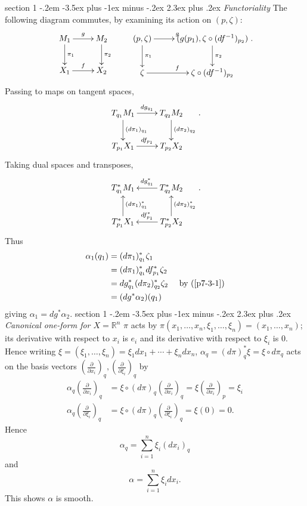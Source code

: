 \documentclass[12pt]{article}
\makeatletter
\theoremstyle{norm}
\newcommand{\R}[0]{\mathbb{R}}
\newcommand{\al}[0]{\alpha}
\newcommand{\pa}[1]{\left( {#1} \right)}
\newcommand{\pd}[2]{\frac{\partial #1}{\partial #2}}
\newenvironment{problem}{\@startsection
       {section}
       {1}
       {-.2em}
       {-3.5ex plus -1ex minus -.2ex}
       {2.3ex plus .2ex}
       {\pagebreak[3]%
       \large\bf\noindent{Problem }
       }
       }
       {%
       }
\makeatother
\begin{document}
\begin{problem}{\it Functoriality}
The following diagram commutes, by examining its action on $(p,\zeta)$:
\[
\xymatrix{
M_1\ar[r]^{g}\ar[d]^{\pi_1}&M_2\ar[d]^{\pi_2}\\
X_1\ar[r]^f& X_2
}\qquad
\xymatrix{
(p,\zeta)\ar[r]^{g}\ar[d]^{\pi_1}&(g(p_1),\zeta\circ (df^{-1})_{p_2})\ar[d]^{\pi_2}\\
\zeta\ar[r]^f& \zeta\circ (df^{-1})_{p_2}
}.
\]
Passing to maps on tangent spaces,
\[
\xymatrix{
T_{q_1}M_1\ar[r]^{dg_{q_1}}\ar[d]^{(d\pi_1)_{q_1}}&T_{q_2}M_2 \ar[d]^{(d\pi_2)_{q_2}}\\
T_{p_1}X_1\ar[r]^{df_{p_1}}& T_{p_2}X_2
}.
\]
Taking dual spaces and transposes,
\begin{equation}\label{p7-3-1}
\xymatrix{
T_{q_1}^*M_1&T_{q_2}^*M_2\ar[l]_{dg_{q_1}^*}\\
T_{p_1}^*X_1\ar[u]_{(d\pi_{1})_{q_1}^*}& T_{p_2}^*X_2\ar[l]_{df_{p_1}^*}
\ar[u]_{(d\pi_{2})_{q_2}^*}
}.
\end{equation}
Thus
\begin{align*}
\al_1(q_1)&=(d\pi_1)_{q_1}^*\zeta_1\\
&=(d\pi_1)_{q_1}^*df_{p_1}^*\zeta_2\\
&=dg^*_{q_1}(d\pi_2)_{q_2}^* \zeta_2&\text{ by~(\ref{p7-3-1})}\\
&=(dg^* \al_2)(q_1)
\end{align*}
giving $\al_1=dg^* \al_2$.
\end{problem}
\begin{problem} {\it Canonical one-form for $X=\R^n$}
$\pi$ acts by $\pi(x_1,\ldots, x_n,\xi_1,\ldots, \xi_n)=(x_1,\ldots, x_n)$; its derivative with respect to $x_i$ is $e_i$ and its derivative with respect to $\xi_i$ is 0. 
Hence writing $\xi=(\xi_1,\ldots, \xi_n)=\xi_1dx_1+\cdots +\xi_ndx_n$, 
$\al_q=(d\pi)_q^*\xi=\xi\circ d\pi_q$ acts on the basis vectors $\pa{\pd{}{x_i}}_q, \pa{\pd{}{\xi_i}}_q$ by
\begin{align*}
\al_q\pa{\pd{}{x_i}}_q&=\xi\circ (d\pi)_q\pa{\pd{}{x_i}}_q=\xi\pa{\pd{}{x_i}}_p=\xi_i\\
\al_q\pa{\pd{}{\xi_i}}_q&=\xi\circ (d\pi)_q\pa{\pd{}{\xi_i}}_q=\xi(0)=0.
\end{align*}
Hence 
\[\al_q=\sum_{i=1}^n \xi_i(dx_i)_q\]
and 
\[\al=\sum_{i=1}^n\xi_i dx_i.\]
This shows $\al$ is smooth.
\end{problem}
\end{document}
